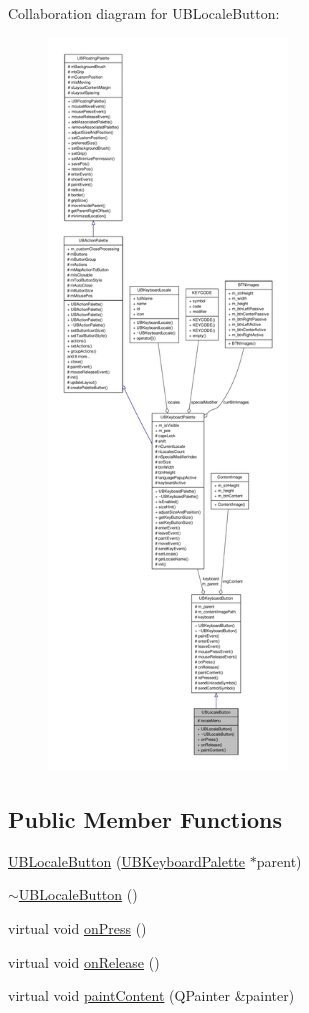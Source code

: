 Collaboration diagram for U\-B\-Locale\-Button\-:
\nopagebreak
\begin{figure}[H]
\begin{center}
\leavevmode
\includegraphics[height=550pt]{d4/dd5/class_u_b_locale_button__coll__graph}
\end{center}
\end{figure}
\subsection*{Public Member Functions}
\begin{DoxyCompactItemize}
\item 
\hyperlink{class_u_b_locale_button_a154f03521f30681deeb61ebf4d1f2c13}{U\-B\-Locale\-Button} (\hyperlink{class_u_b_keyboard_palette}{U\-B\-Keyboard\-Palette} $\ast$parent)
\item 
\hyperlink{class_u_b_locale_button_a81cc897eec838af211f430d682fae0c2}{$\sim$\-U\-B\-Locale\-Button} ()
\item 
virtual void \hyperlink{class_u_b_locale_button_a141dc49b7d3cab7e61af85a2caabf986}{on\-Press} ()
\item 
virtual void \hyperlink{class_u_b_locale_button_af1a4fd4fc40f6aebde6a90aae9849945}{on\-Release} ()
\item 
virtual void \hyperlink{class_u_b_locale_button_ac92fae2d2126006d0ce4012a3d66486b}{paint\-Content} (Q\-Painter \&painter)
\end{DoxyCompactItemize}
